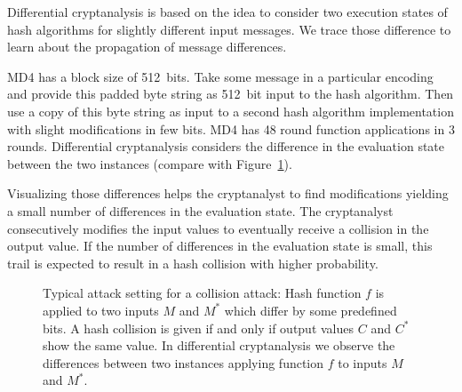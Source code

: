 Differential cryptanalysis is based on the idea to consider two execution states
of hash algorithms for slightly different input messages. We trace those difference
to learn about the propagation of message differences.

MD4 has a block size of 512~bits. Take some message in a particular encoding
and provide this padded byte string as 512~bit input to the hash algorithm.
Then use a copy of this byte string as input to a second hash algorithm implementation
with slight modifications in few bits. MD4 has 48 round function applications
in 3 rounds. Differential cryptanalysis considers the difference in the evaluation
state between the two instances (compare with Figure~\ref{tab:collision-attack}).

Visualizing those differences helps the cryptanalyst to find modifications yielding
a small number of differences in the evaluation state.
The cryptanalyst consecutively modifies the input values to eventually
receive a collision in the output value.
If the number of differences in the evaluation state is small,
this trail is expected to result in a hash collision with higher probability.

\begin{figure}[pbt]
  \begin{center}
    \caption[Typical attack setting for a collision attack]{
      Typical attack setting for a collision attack:
      Hash function $f$ is applied to two inputs $M$ and $M^*$ which differ
      by some predefined bits. A hash collision is given if and only if output values
      $C$ and $C^*$ show the same value. In differential cryptanalysis we observe
      the differences between two instances applying function $f$
      to inputs $M$ and $M^*$.
    }
    \label{tab:collision-attack}
  \end{center}
\end{figure}

